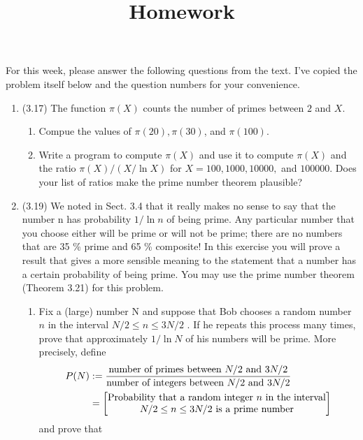 \documentclass[12pt]{amsart}
\theoremstyle{definition}
\begin{document}
\title{Homework}

\maketitle

For this week, please answer the following questions from the text. 
I've copied the problem itself below and the question numbers for 
your convenience. 

\begin{enumerate}
	\item (3.17) The function $\pi(X)$ counts the number of primes between $2$ and $X$. 
		\begin{enumerate}
		\item Compue the values of $\pi(20),\pi(30)$, and $\pi(100)$. 
		\item Write a program to compute $\pi(X)$ and use it to compute $\pi(X)$ and 
			the ratio $\pi(X)/(X/\ln X)$ for $X = 100, 1000, 10000,$ and $100000$. 
			Does your list of ratios make the prime number theorem plausible? 
		\end{enumerate}
	\item (3.19) We noted in Sect. 3.4 that it really makes no sense to say
		that the number n has probability $1/\ln n$ of being prime. Any
		particular number that you choose either will be prime or will
		not be prime; there are no numbers that are 35 \% prime and 65 \%
		composite! In this exercise you will prove a result that gives
		a more sensible meaning to the statement that a number has a
		certain probability of being prime. You may use the prime
		number theorem (Theorem 3.21) for this problem.
		\begin{enumerate}
			\item Fix a (large) number N and suppose that Bob
			chooses a random number $n$ in the interval $N/2
			\leq n \leq 3N/2$ . If he repeats this process many
			times, prove that approximately $1/\ln N$ of his
			numbers will be prime. More precisely, define
			\begin{align*}
				P(N) & := \frac{\text{number of primes between $N/2$ and 
					$3N/2$}}{\text{number of integers between $N/2$ 
					and $3N/2$}} \\
				     & = \left[\Centerstack{\text{Probability that a random integer $n$ 
			     in the interval} \newline \text{$N/2 \leq n \leq 3N/2$ is a prime number}} \right]
			\end{align*}
			and prove that 
			\begin{displaymath}

\end{displaymath}
\end{enumerate}
\end{enumerate}
\end{document}
